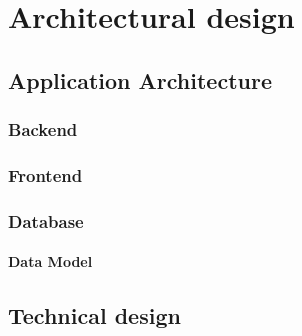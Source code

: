 \chapter{Architectural design}
\label{chap:architectural-design}

\section{Application Architecture}
\label{sec:application-architecture}
\subsection{Backend}
\label{subsec:backend}
\subsection{Frontend}
\label{subsec:frontend}
\subsection{Database}
\label{subsec:database}
\subsubsection{Data Model}
\label{subsubsec:data-model}
\section{Technical design}
\label{sec:technical-design}
